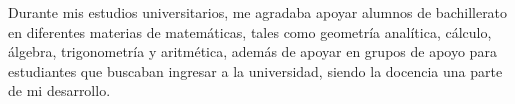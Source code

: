 \documentclass[letterpaper]{twentysecondcv} %
\begin{document}
Durante mis estudios universitarios, me agradaba apoyar alumnos de bachillerato en diferentes materias de matemáticas, tales como geometría analítica, cálculo, álgebra, trigonometría y aritmética, además de apoyar en grupos de apoyo para estudiantes que buscaban ingresar a la universidad, siendo la docencia una parte de mi desarrollo.








\end{document}
